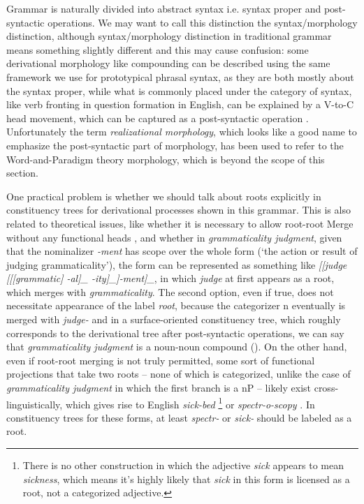 \documentclass[UTF8, a4paper, oneside, scheme=plain, 12pt]{ctexrep}
\newcommand*{\citepage}[1]{p.~{#1}}
\newcommand*{\term}[1]{\emph{#1}}
\newcommand{\form}[1]{\emph{#1}}
\newcommand{\translate}[1]{`#1'}
\begin{document}
{Grammar is naturally divided into abstract syntax i.e. syntax proper and post-syntactic operations.
We may want to call this distinction the syntax/morphology distinction,
although syntax/morphology distinction in traditional grammar means something slightly different and
this may cause confusion: some derivational morphology like compounding can be described using the same framework we use for prototypical phrasal syntax,
as they are both mostly about the syntax proper,
while what is commonly placed under the category of syntax,
like verb fronting in question formation in English,
can be explained by a V-to-C head movement, which can be captured as a post-syntactic operation 
\citep[\citepage{24}]{siddiqi2009syntax}.
Unfortunately the term \term{realizational morphology},
which looks like a good name to emphasize the post-syntactic part of morphology, 
has been used to refer to the Word-and-Paradigm theory morphology,
which is beyond the scope of this section.

One practical problem is whether we should talk about roots explicitly in 
constituency trees for derivational processes shown in this grammar.
This is also related to theoretical issues,
like whether it is necessary to allow root-root Merge without any functional heads \citep{zhang2007root},
and whether in \form{grammaticality judgment},
given that the nominalizer \form{-ment} has scope over the whole form
(\translate{the action or result of judging grammaticality}),
the form can be represented
as something like \form{[[judge [[[grammatic] -al]_{} -ity]_{}]-ment]_{\text{N}}},
in which \form{judge} at first appears as a root,
which merges with \form{grammaticality}.
The second option, even if true, does not necessitate appearance of the label \term{root},
because the categorizer n eventually is merged with \form{judge-}
and in a surface-oriented constituency tree, which roughly corresponds to the derivational tree after post-syntactic operations, we can say that \form{grammaticality judgment} is a noun-noun compound
().
On the other hand, even if root-root merging is not truly permitted,
some sort of functional projections that take two roots -- none of which is categorized,
unlike the case of \form{grammaticality judgment} in which the first branch is a nP --
likely exist cross-linguistically, which gives rise to English \form{sick-bed}%
\footnote{
    There is no other construction in which the adjective \form{sick} appears to mean \form{sickness},
    which means it's highly likely that \form{sick} in this form is licensed as a root,
    not a categorized adjective.
}
or \form{spectr-o-scopy} \citep{di2005decomposing}.
In constituency trees for these forms, at least \form{spectr-} or \form{sick-} should be labeled as a root.

}
\end{document}
